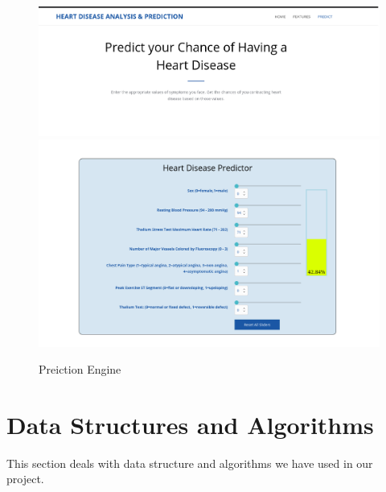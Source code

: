 \documentclass{book}
\begin{document}
    			\begin{figure}
    				\begin{center}
    				\includegraphics[width=17cm]{images/prediction-header}
    				\includegraphics[width=17cm]{images/prediction}
    				\caption{Preiction Engine}
    				\end{center}
    			\end{figure}
    
    \pagebreak
    \section{Data Structures and Algorithms}
    	This section deals with data structure and algorithms we have used in our project.
    	
\end{document}
